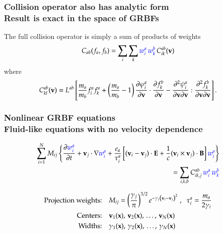 \begin{frame}
\frametitle{Collision operator also has analytic form\\
\textcolor{egg}{\large Result is exact in the space of GRBFs}}

The full collision operator is simply a sum of products of weights
\begin{equation*}
C_{ab}(f_a,f_b) = \sum_i \sum_k \textcolor{blue}{w^a_i} \, \textcolor{blue}{w^b_k} \, C^{ab}_{ik}(\mathbf{v})
\end{equation*}
%
where
%
\begin{align*}
C^{ab}_{kl}(\mathbf{v})=L^{ab}\left[\frac{m_a}{m_b}f_i^a f_k^a+
 \left(\frac{m_a}{m_b}-1\right)\frac{\partial\varphi_i^a}{\partial\mathbf{v}}\cdot\frac{\partial f_k^b}{\partial\mathbf{v}}
-\frac{\partial^2\psi_i^a}{\partial\mathbf{v}\partial\mathbf{v}}:\frac{\partial^2f_k^b}{\partial\mathbf{v}\partial\mathbf{v}}\right].
\end{align*}

\end{frame}

\begin{frame}
\frametitle{Nonlinear GRBF equations \\
\textcolor{egg}{\large Fluid-like equations with no velocity dependence}}
%
\vspace{2mm}
\begin{tcolorbox}[%
colback=blue!3,
colframe=blue!40!black,
title={Fluid equations for $w_1^a, \, w_2^2, \, \ldots, \, w_N^a$}]
\begin{equation*}
\begin{split}
\sum_{i=1}^N M_{ij} \left\{
\frac{\partial\textcolor{blue}{w_i^a}}{\partial t} + \mathbf{v}_j\cdot\nabla \textcolor{blue}{w_i^a} +
\frac{e_a}{{\tau}_i^a} \left[
(\mathbf{v}_i-\mathbf{v}_j) \cdot \mathbf{E} + \frac{1}{c} (\mathbf{v}_i \times \mathbf{v}_j) \cdot \mathbf{B} \right] \textcolor{blue}{w_i^a}
\right\} \\
= \sum_{i,k,b} C_{ik,j}^{ab} \, \textcolor{blue}{w_i^a} \, \textcolor{blue}{w_k^b}
\end{split}
\end{equation*}
\end{tcolorbox}
\vspace{-2mm}
\begin{align*}
\mbox{Projection weights:}  \quad & M_{ij} = \left(\frac{\gamma_j}{\pi}\right)^{3/2}
e^{-\gamma_j\left(\mathbf{v}_i-\mathbf{v}_j\right)^2} \; , \;\; {\tau}_i^a = \frac{m_a}{2\gamma_i}\\
\mbox{Centers:} \quad & \mathbf{v}_1(\mathbf{x}), \, \mathbf{v}_2(\mathbf{x}), \, \ldots, \, \mathbf{v}_N(\mathbf{x}) \\
\mbox{Widths:} \quad & \gamma_1(\mathbf{x}), \, \gamma_2(\mathbf{x}), \, \ldots, \, \gamma_N(\mathbf{x})
\end{align*}

\end{frame}

